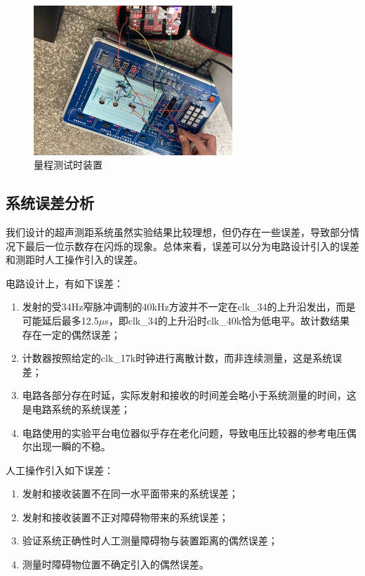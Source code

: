 \documentclass[a4paper, twocolumn]{ctexart}
\begin{document}
\begin{figure}[ht]
    \centering
    \includegraphics[width=7.5cm]{../assets/量程测试.jpg}
    \caption{量程测试时装置}
    \label{fig:ceil}
\end{figure}

\subsection{系统误差分析}

我们设计的超声测距系统虽然实验结果比较理想，但仍存在一些误差，导致部分情况下最后一位示数存在闪烁的现象。总体来看，误差可以分为电路设计引入的误差和测距时人工操作引入的误差。

电路设计上，有如下误差：

\begin{enumerate}
    \item 发射的受34Hz窄脉冲调制的40kHz方波并不一定在clk\_34的上升沿发出，而是可能延后最多12.5$\mu$s，即clk\_34的上升沿时clk\_40k恰为低电平。故计数结果存在一定的偶然误差；
    \item 计数器按照给定的clk\_17k时钟进行离散计数，而非连续测量，这是系统误差；
    \item 电路各部分存在时延，实际发射和接收的时间差会略小于系统测量的时间，这是电路系统的系统误差；
    \item 电路使用的实验平台电位器似乎存在老化问题，导致电压比较器的参考电压偶尔出现一瞬的不稳。
\end{enumerate}

人工操作引入如下误差：

\begin{enumerate}
    \item 发射和接收装置不在同一水平面带来的系统误差；
    \item 发射和接收装置不正对障碍物带来的系统误差；
    \item 验证系统正确性时人工测量障碍物与装置距离的偶然误差；
    \item 测量时障碍物位置不确定引入的偶然误差。
\end{enumerate}
\end{document}
